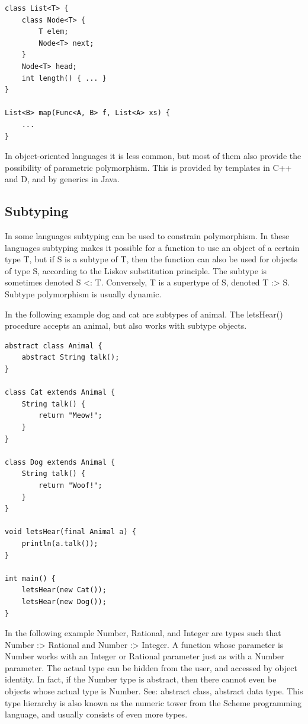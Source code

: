 \documentclass[margin=0px]{article}
\begin{document}
\begin{verbatim}
class List<T> {
    class Node<T> {
        T elem;
        Node<T> next;
    }
    Node<T> head;
    int length() { ... }
}

List<B> map(Func<A, B> f, List<A> xs) {
    ...
}
\end{verbatim}

In object-oriented languages it is less common, but most of them also provide the possibility of parametric polymorphism. This is provided by templates in C++ and D, and by generics in Java.

\subsection{Subtyping}
In some languages subtyping can be used to constrain polymorphism. In these languages subtyping makes it possible for a function to use an object of a certain type T, but if S is a subtype of T, then the function can also be used for objects of type S, according to the Liskov substitution principle. The subtype is sometimes denoted S <: T. Conversely, T is a supertype of S, denoted T :> S. Subtype polymorphism is usually dynamic.

In the following example dog and cat are subtypes of animal. The letsHear() procedure accepts an animal, but also works with subtype objects.

\begin{verbatim}
abstract class Animal {
    abstract String talk();
}

class Cat extends Animal {
    String talk() {
        return "Meow!";
    }
}

class Dog extends Animal {
    String talk() {
        return "Woof!";
    }
}

void letsHear(final Animal a) {
    println(a.talk());
}

int main() {
    letsHear(new Cat());
    letsHear(new Dog());
}
\end{verbatim}

In the following example Number, Rational, and Integer are types such that Number :> Rational and Number :> Integer. A function whose parameter is Number works with an Integer or Rational parameter just as with a Number parameter. The actual type can be hidden from the user, and accessed by object identity. In fact, if the Number type is abstract, then there cannot even be objects whose actual type is Number. See: abstract class, abstract data type. This type hierarchy is also known as the numeric tower from the Scheme programming language, and usually consists of even more types.
\end{document}
